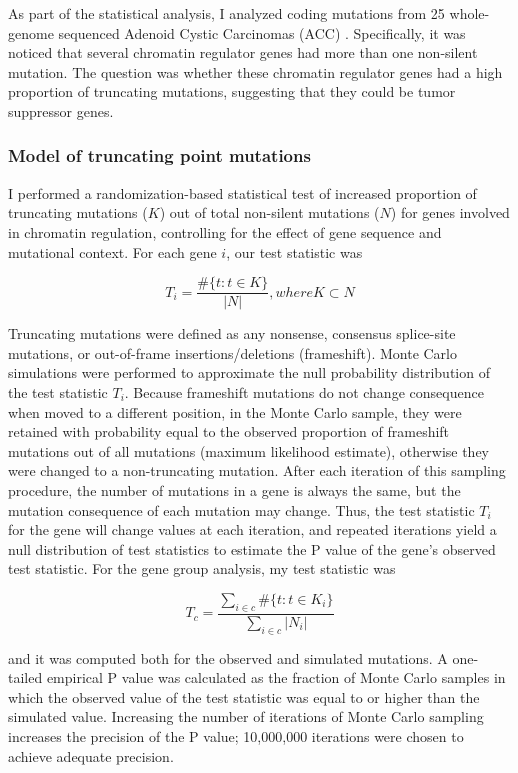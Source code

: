 As part of the statistical analysis, I analyzed coding mutations from 25 whole-genome sequenced Adenoid Cystic Carcinomas (ACC) \cite{RN76}. Specifically, it was noticed that several chromatin regulator genes had more than one non-silent mutation. The question was whether these chromatin regulator genes had a high proportion of truncating mutations, suggesting that they could be tumor suppressor genes.

\subsubsection{Model of truncating point mutations}

I performed a randomization-based statistical test of increased proportion of truncating mutations ($K$) out of total non-silent mutations ($N$) for genes involved in chromatin regulation, controlling for the effect of gene sequence and mutational context. For each gene $i$, our test statistic was

\begin{equation}
T_i = \frac{\#\{t : t\in K\}}{|N|}, where K\subset N
\end{equation}

Truncating mutations were defined as any nonsense, consensus splice-site mutations, or out-of-frame insertions/deletions (frameshift). Monte Carlo simulations were performed to approximate the null probability distribution of the test statistic $T_i$. Because frameshift mutations do not change consequence when moved to a different position, in the Monte Carlo sample, they were retained with probability equal to the observed proportion of frameshift mutations out of all mutations (maximum likelihood estimate), otherwise they were changed to a non-truncating mutation. After each iteration of this sampling procedure, the number of mutations in a gene is always the same, but the mutation consequence of each mutation may change. Thus, the test statistic $T_i$ for the gene will change values at each iteration, and repeated iterations yield a null distribution of test statistics to estimate the P value of the gene's observed test statistic. For the gene group analysis, my test statistic was

\begin{equation}
T_c = \frac{\sum_{i\in c}{\#\{t:t\in K_i\}}}{\sum_{i\in c}{|N_i|}}
\end{equation}

and it was computed both for the observed and simulated mutations. A one-tailed empirical P value was calculated as the fraction of Monte Carlo samples in which the observed value of the test statistic was equal to or higher than the simulated value. Increasing the number of iterations of Monte Carlo sampling increases the precision of the P value; 10,000,000 iterations were
chosen to achieve adequate precision.

